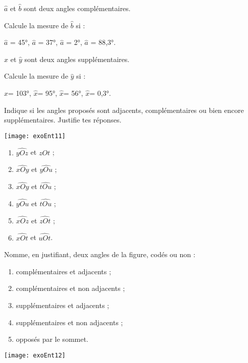 





\begin{exercice}
$\hat{a}$ et $\hat{b}$ sont deux angles complémentaires.

Calcule la mesure de $\hat{b}$ si :

$\hat{a}$ = 45°,\hfill%
$\hat{a}$ = 37°,\hfill%
$\hat{a}$ = 2°,\hfill%
$\hat{a}$ = 88,3°.  
\end{exercice}



\begin{exercice}
$\hat{x}$ et $\hat{y}$ sont deux angles supplémentaires.

Calcule la mesure de $\hat{y}$ si :

$\hat{x}$= 103°,\hfill%
$\hat{x}$= 95°,\hfill%
$\hat{x}$= 56°,\hfill%
$\hat{x}$= 0,3°.
\end{exercice}




\begin{exercice}
Indique si les angles proposés sont adjacents, complémentaires ou bien encore supplémentaires. Justifie tes réponses. 

\begin{center}
    \texttt{[image: exoEnt11]}
\end{center}

\begin{enumerate}
\item $\widehat{yOz}$ et $\widehat{zOt}$ ;
\item $\widehat{xOy}$ et $\widehat{yOu}$ ;
\item $\widehat{xOy}$ et $\widehat{tOu}$ ;
\item $\widehat{yOu}$ et $\widehat{tOu}$ ;
\item $\widehat{xOz}$ et $\widehat{zOt}$ ;
\item $\widehat{xOt}$ et $\widehat{uOt}$.
\end{enumerate}
\end{exercice}


\columnbreak
\begin{exercice}
Nomme, en justifiant, deux angles de la figure, codés ou non :
\begin{enumerate}
\item complémentaires et adjacents ;
\item complémentaires et non adjacents ;
\item supplémentaires et adjacents ;
\item supplémentaires et non adjacents ;
\item opposés par le sommet.
\end{enumerate}

\begin{center}
    \texttt{[image: exoEnt12]}
\end{center}

\end{exercice}




